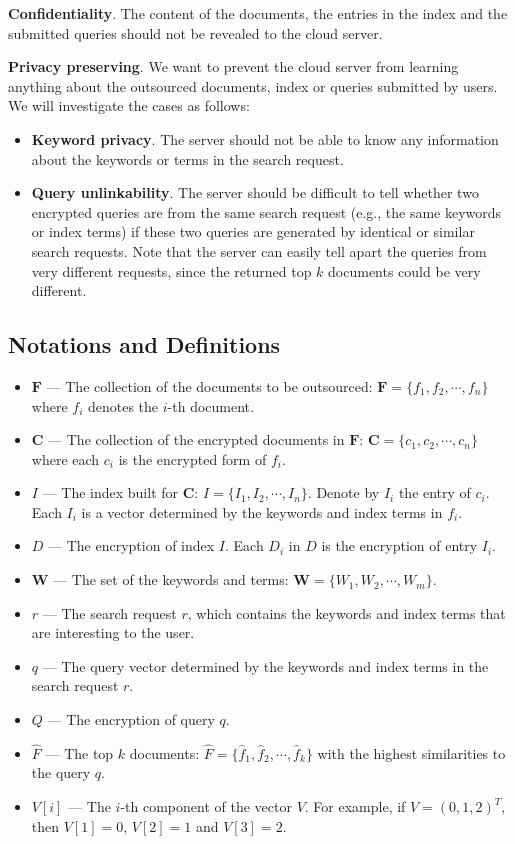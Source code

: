 \documentclass{IEEEtran}
\begin{document}
\textbf{Confidentiality}. The content of the documents, the entries in the index and the submitted queries should not be revealed to the cloud server.

\textbf{Privacy preserving}. We want to prevent the cloud server from learning anything about the outsourced documents, index or queries submitted by users. We will investigate the cases as follows:
\begin{itemize}
\item \textbf{Keyword privacy}. The server should not be able to know any information about the keywords or terms in the search request.
\item \textbf{Query unlinkability}. The server should be difficult to tell whether two encrypted queries are from the same search request (e.g., the same keywords or index terms) if these two queries are generated by identical or similar search requests. Note that the server can easily tell apart the queries from very different requests, since the returned top $k$ documents could be very different.
\end{itemize}

\subsection{Notations and Definitions}
\label{sec:prelim}
\begin{itemize}
\item $\mathbf{F}$ \---- The collection of the documents to be outsourced: $\mathbf{F} = \{f_1, f_2, \cdots, f_n\}$ where $f_i$ denotes the $i$-th document.
\item $\mathbf{C}$ \---- The collection of the encrypted documents in $\mathbf{F}$: $\mathbf{C} = \{c_1, c_2, \cdots, c_n\}$ where each $c_i$ is the encrypted form of $f_i$.
\item $I$ \---- The index built for $\mathbf{C}$: $I = \{I_1, I_2, \cdots, I_n\}$. Denote by $I_i$ the entry of $c_i$. Each $I_i$ is a vector determined by the keywords and index terms in $f_i$.
\item $D$ \---- The encryption of index $I$. Each $D_i$ in $D$ is the encryption of entry $I_i$.
\item $\mathbf{W}$ \---- The set of the keywords and terms: $\mathbf{W} = \{W_1, W_2, \cdots, W_m\}$.
\item $r$ \---- The search request $r$, which contains the keywords and index terms that are interesting to the user.
\item $q$ \---- The query vector determined by the keywords and index terms in the search request $r$.
\item $Q$ \---- The encryption of query $q$.
\item $\hat{F}$ \---- The top $k$ documents: $\hat{F} = \{\hat{f}_1, \hat{f}_2, \cdots, \hat{f}_k\}$ with the highest similarities to the query $q$.
\item $V[i]$ \---- The $i$-th component of the vector $V$. For example, if $V = (0,1,2)^T$, then $V[1] = 0$, $V[2] = 1$ and $V[3] = 2$.
\end{itemize}
\end{document}
